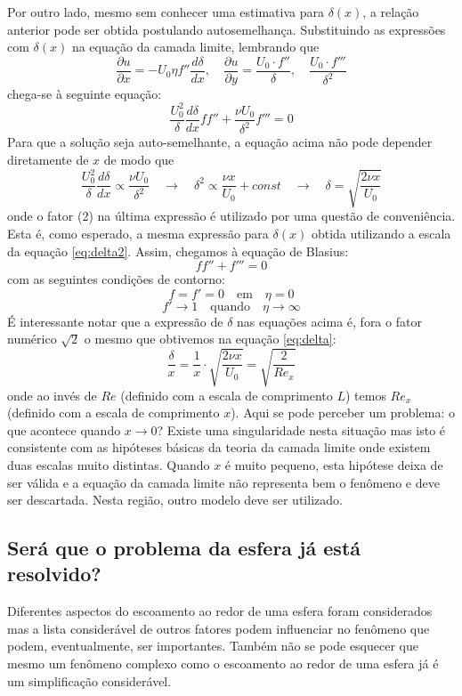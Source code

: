 \documentclass[article,12pt,oneside,a4paper,english,brazil,sumario=tradicional]{abntex2}
\newcommand{\lra}{\ensuremath{\longrightarrow}}
\newcommand{\qrq}{\ensuremath{\quad\lra\quad}}
\begin{document}
Por outro lado, mesmo sem conhecer uma estimativa para $\delta(x)$, a relação anterior pode ser obtida postulando autosemelhança. Substituindo as expressões com $\delta(x)$ na equação da camada limite, lembrando que 
\[
\frac{\partial u}{\partial x} = -U_0\eta f'' \frac{d\delta}{dx}, 
\quad \frac{\partial u}{\partial y} = \frac{U_0 \cdot f''}{\delta}, \quad \frac{U_0 \cdot f'''}{\delta^2}
\]
chega-se à seguinte equação:
\[
\frac{U_0^2}{\delta}\frac{d\delta}{dx} ff'' + \frac{\nu U_0}{\delta^2}f''' = 0
\]
Para que a solução seja auto-semelhante, a equação acima não pode depender diretamente de $x$ de modo que
\[
\frac{U_0^2}{\delta}\frac{d\delta}{dx} \propto \frac{\nu U_0}{\delta^2} \qrq \delta^2 \propto \frac{\nu x}{U_0} + const \qrq \delta = \sqrt{\frac{2 \nu x}{U_0}}
\]
onde o fator (2) na última expressão é utilizado por uma questão de conveniência. Esta é, como esperado, a mesma expressão para $\delta(x)$ obtida utilizando a escala da equação \ref{eq:delta2}. Assim, chegamos à equação de Blasius:
\[
ff'' + f''' = 0
\]
com as seguintes condições de contorno:
\[
f = f' = 0 \quad\text{em}\quad \eta = 0
\]
\[
f' \lra 1 \quad\text{quando}\quad \eta\lra\infty
\]
É interessante notar que a expressão de $\delta$ nas equações acima é, fora o fator numérico $\sqrt{2}$ o mesmo que obtivemos na equação \ref{eq:delta}:
\[
\frac{\delta}{x} = \frac{1}{x}\cdot \sqrt{\frac{2 \nu x}{U_0}} = \sqrt{\frac{2}{Re_x}}
\]
onde ao invés de $Re$ (definido com a escala de comprimento $L$) temos $Re_x$ (definido com a escala de comprimento $x$). Aqui se pode perceber um problema: o que acontece quando $x\lra 0$? Existe uma singularidade nesta situação  mas isto é consistente com as hipóteses básicas da teoria da camada limite onde existem duas escalas muito distintas. Quando $x$ é muito pequeno, esta hipótese deixa de ser válida e a equação da camada limite não representa bem o fenômeno e deve ser descartada. Nesta região, outro modelo deve ser utilizado.



\subsection{Será que o problema da esfera já está resolvido?}

Diferentes aspectos do escoamento ao redor de uma esfera foram considerados mas a lista considerável de outros fatores podem influenciar no fenômeno que podem, eventualmente, ser importantes. Também não se pode esquecer que mesmo um fenômeno complexo como o escoamento ao redor de uma esfera já é um simplificação considerável. 
\end{document}
